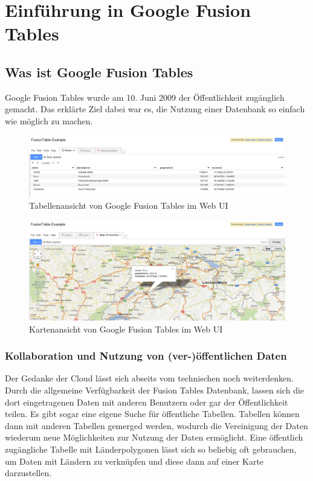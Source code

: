 \chapter{Einführung in Google Fusion Tables}

\section{Was ist Google Fusion Tables}
Google Fusion Tables wurde am 10. Juni 2009 der Öffentlichkeit zugänglich gemacht\cite{fusion-table-announce}. Das erklärte Ziel dabei war es, die Nutzung einer Datenbank so einfach wie möglich zu machen.

\begin{figure}[!ht]
	\centering
	\includegraphics[width=\textwidth]{images/einfuehrung/gft-webgui-table}
	\caption{Tabellenansicht von Google Fusion Tables im Web UI}
	\label{gft-webgui-table}
\end{figure}

\begin{figure}[!ht]
	\centering
	\includegraphics[width=\textwidth]{images/einfuehrung/gft-webgui-map}
	\caption{Kartenansicht von Google Fusion Tables im Web UI}
	\label{gft-webgui-map}
\end{figure}

\subsection{Kollaboration und Nutzung von (ver-)öffentlichen Daten}
Der Gedanke der \gls{Cloud} lässt sich abseits vom technischen noch weiterdenken. Durch die allgemeine Verfügbarkeit der Fusion Tables Datenbank, lassen sich die dort eingetragenen Daten mit anderen Benutzern oder gar der Öffentlichkeit teilen. Es gibt sogar eine eigene Suche für öffentliche Tabellen.\cite{fusion-tables-search} Tabellen können dann mit anderen Tabellen gemerged werden, wodurch die Vereinigung der Daten wiederum neue Möglichkeiten zur Nutzung der Daten ermöglicht. Eine öffentlich zugängliche Tabelle mit Länderpolygonen lässt sich so beliebig oft gebrauchen, um Daten mit Ländern zu verknüpfen und diese dann auf einer Karte darzustellen.

